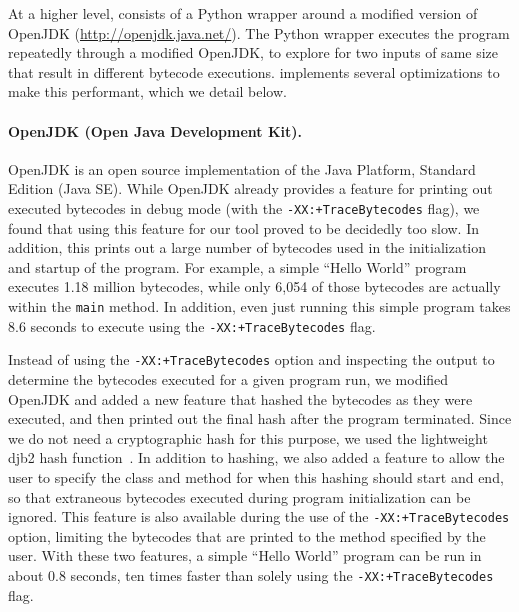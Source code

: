 At a higher level, \jcupid consists of a Python wrapper around a modified
version of OpenJDK (\url{http://openjdk.java.net/}). 
The Python wrapper executes the program repeatedly through a modified
OpenJDK, to explore for two inputs of same size that result in different bytecode
executions.
\jcupid implements several optimizations to make this performant, which we
detail below. 

\paragraph{OpenJDK (Open Java Development Kit).}
\label{sec:OpenJDK}
OpenJDK is an open source implementation of the Java Platform, Standard Edition
(Java SE). 
While OpenJDK already provides a feature for printing out executed bytecodes in
debug mode (with the \texttt{-XX:+TraceBytecodes} flag), we found that using
this feature for our tool proved to be decidedly too slow. In addition,
this prints out a large number of bytecodes used in the initialization and
startup of the program. For example, a simple ``Hello World'' program executes
1.18 million bytecodes, while only 6,054 of those bytecodes are actually within
the \texttt{main} method. In addition, even just running this simple program
takes 8.6 seconds to execute using the \texttt{-XX:+TraceBytecodes} flag.

Instead of using the \texttt{-XX:+TraceBytecodes} option and inspecting the
output to determine the bytecodes executed for a given program run, we modified
OpenJDK and added a new feature that hashed the bytecodes as they were executed,
and then printed out the final hash after the program terminated.
Since we do not need a cryptographic hash for this purpose, we used the
lightweight djb2 hash function~\cite{djb2Hash}.
In addition to hashing, we also added a feature to allow the user
to specify the class and method for when this hashing should start and end, so
that extraneous bytecodes executed during program initialization can be ignored.
This feature is also available during the use of the
\texttt{-XX:+TraceBytecodes} option, limiting the bytecodes that are printed to
the method specified by the user. With these two features, a simple ``Hello
World'' program can be run in about 0.8 seconds, ten times faster than solely using
the \texttt{-XX:+TraceBytecodes} flag.

